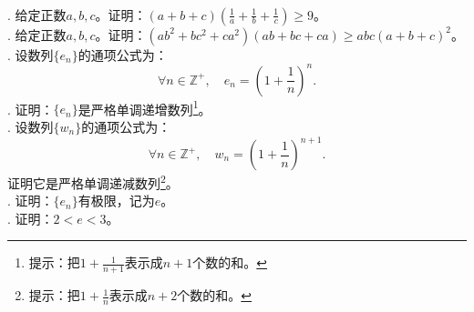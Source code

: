 \documentclass[12pt,UTF8]{ctexbook}
\begin{document}
\begin{xt}    
    \mbox{}\\
    . 给定正数$a,b,c$。证明：$(a + b + c)(\frac{1}{a}+\frac{1}{b}+\frac{1}{c}) \geqslant 9$。\\
    . 给定正数$a,b,c$。证明：$(ab^2 + bc^2 + ca^2)(ab + bc + ca) \geqslant abc(a+b+c)^2$。 \\
    . 设数列$\{e_n\}$的通项公式为：
    $$ \forall n\in\mathbb{Z}^+,\quad e_n = \left(1 + \frac{1}{n}\right)^n.$$
    . 证明：$\{e_n\}$是严格单调递增数列\footnote{提示：把$1 + \frac{1}{n+1}$表示成$n+1$个数的和。}。\\
    . 设数列$\{w_n\}$的通项公式为：
    $$ \forall n\in\mathbb{Z}^+,\quad w_n = \left(1 + \frac{1}{n}\right)^{n+1}.$$
    证明它是严格单调递减数列\footnote{提示：把$1 + \frac{1}{n}$表示成$n+2$个数的和。}。 \\
    . 证明：$\{e_n\}$有极限，记为$e$。\\
    . 证明：$2 < e < 3$。
\end{xt}
\end{document}
